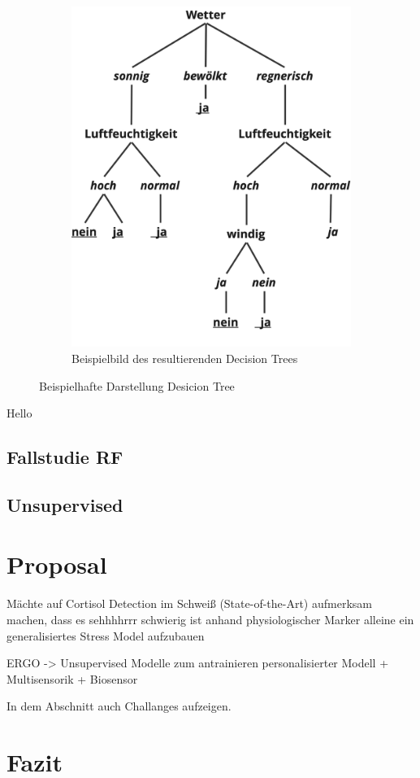\begin{figure}[h!]
\begin{subfigure}[b]{0.45\textwidth}
        \includegraphics[width=\textwidth]{../Bilder/DT_ex.png}
        \caption{Beispielbild des resultierenden Decision Trees}
        \label{fig:example}
    \end{subfigure}
    \caption{Beispielhafte Darstellung Desicion Tree}
\end{figure}

Hello


\subsection{Fallstudie RF}

\subsection{Unsupervised}


\section{Proposal}
    Mächte auf Cortisol Detection im Schweiß (State-of-the-Art) aufmerksam machen, dass es sehhhhrrr schwierig ist anhand physiologischer Marker alleine ein generalisiertes Stress Model aufzubauen

     ERGO -> Unsupervised Modelle zum antrainieren personalisierter Modell + Multisensorik + Biosensor

    In dem Abschnitt auch Challanges aufzeigen.

\section{Fazit}
    
    
